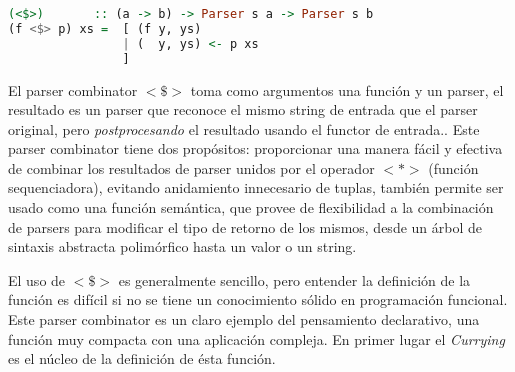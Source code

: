 \begin{lstlisting}[language=Haskell, caption=definición del parser $<\$>$]
(<$>)		:: (a -> b) -> Parser s a -> Parser s b
(f <$> p) xs = 	[ (f y, ys)
				| (  y, ys) <- p xs
				]
\end{lstlisting}

El parser combinator $<\$>$ toma como argumentos una función y un parser, el resultado es un parser que reconoce el mismo string de entrada que el parser original, pero \emph{postprocesando} el resultado usando el functor de entrada.\cite{Jeuring2010}. Este parser combinator tiene dos propósitos: proporcionar una manera fácil y efectiva de combinar los resultados de parser unidos por el operador $<*>$ (función sequenciadora), evitando anidamiento innecesario de tuplas, también permite ser usado como una función semántica, que provee de flexibilidad a la combinación de parsers para modificar el tipo de retorno de los mismos, desde un árbol de sintaxis abstracta polimórfico hasta un valor o un string. 

El uso de $<\$>$ es generalmente sencillo, pero entender la definición de la función es difícil si no se tiene un conocimiento sólido en programación funcional. Este parser combinator es un claro ejemplo del pensamiento declarativo, una función muy compacta con una aplicación compleja. En primer lugar el \emph{Currying} es el núcleo de la definición de ésta función.

